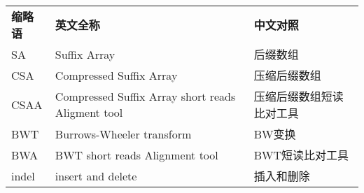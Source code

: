 \begin{symbolstable}
\end{symbolstable}


\begin{abbreviation}\renewcommand{\arraystretch}{1.3}
\noindent
\begin{table}[ht]
\begin{tabular}{p{2cm}p{6cm}p{8cm}}
\textbf{缩略语}&\textbf{英文全称}&\textbf{中文对照}\\
SA &Suffix Array &后缀数组\\
CSA & Compressed Suffix Array &压缩后缀数组\\
CSAA & Compressed Suffix Array short reads Aligment tool & 压缩后缀数组短读比对工具\\
BWT & Burrows-Wheeler transform&BW变换\\
BWA & BWT short reads Alignment tool & BWT短读比对工具\\
indel & insert and delete &插入和删除\\
\end{tabular}
\end{table}
\end{abbreviation}
